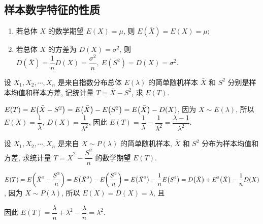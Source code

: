 \subsection{样本数字特征的性质}

\begin{theorem}[样本数字特征的性质]
    \begin{enumerate}[label=(\arabic{*})]
        \item 若总体 $ X $ 的数学期望 $ E(X)=\mu$, 则 $E(\bar{X})=E(X)=\mu ;$
        \item 若总体 $ X $ 的方差为 $ D(X)=\sigma^{2} $, 则 $D(\bar{X})=\dfrac{1}{n} D(X)=\dfrac{\sigma^{2}}{n},~E\left(S^{2}\right)=D(X)=\sigma^{2} .$
    \end{enumerate}
\end{theorem}

\begin{example}
    设 $X_1,X_2,\cdots,X_n$ 是来自指数分布总体 $E(\lambda)$ 的简单随机样本 $\bar{X}$ 和 $S^2$ 分别是样本均值和样本方差, 记统计量 $T=\bar{X}-S^2$, 求 $E(T).$
\end{example}
\begin{solution}
    $E(T)=E\qty(\bar{X}-S^2)=E\qty(\bar{X})-E\qty(S^2)=E\qty(\bar{X})-D(X)$, 因为 $X\sim E(\lambda)$, 所以 $E(X)=\dfrac{1}{\lambda},~D(X)=\dfrac{1}{\lambda^2}$, 因此 $E(T)=\dfrac{1}{\lambda}-\dfrac{1}{\lambda^2}=\dfrac{\lambda-1}{\lambda^2}.$
\end{solution}

\begin{example}
    设 $X_1,X_2,\cdots,X_n$ 是来自 $X\sim P(\lambda)$ 的简单随机样本, $\bar{X}$ 和 $S^2$ 分布为样本均值和方差, 求统计量 $T=\bar{X}^2-\dfrac{S^2}{n}$ 的数学期望 $E(T).$
\end{example}
\begin{solution}
    $E(T)=E\qty(\bar{X}^2-\dfrac{S^2}{n})=E\qty(\bar{X}^2)-E\qty(\dfrac{S^2}{n})=E\qty(\bar{X}^2)-\dfrac{1}{n}E\qty(S^2)=D\qty(\bar{X})+E^2\qty(\bar{X})-\dfrac{1}{n}D(X)$, 
    因为 $X\sim P(\lambda)$, 所以 $E(X)=D(X)=\lambda$, 且 
    因此 $E(T)=\dfrac{\lambda}{n}+\lambda^2-\dfrac{\lambda}{n}=\lambda^2.$
\end{solution}
